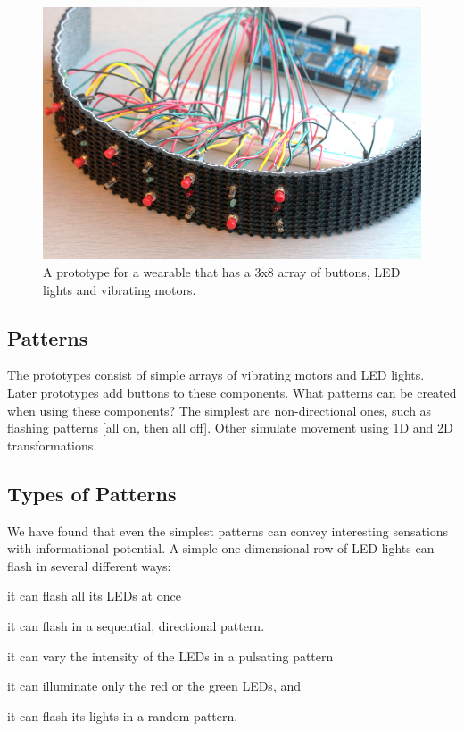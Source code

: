 \documentclass{chi-ext}
\begin{document}
\begin{figure}
  \begin{center}
  \includegraphics[width=\columnwidth]{images/P1130396.jpg}
  \caption{A prototype for a wearable that has a 3x8 array of buttons, LED lights and vibrating motors.}
  \label{fig:marginparsample}
  \end{center}  
\end{figure}

\subsection{Patterns}
The prototypes consist of simple arrays of vibrating motors and LED lights. Later prototypes add buttons to these components. What patterns can be created when using these components? The simplest are non-directional ones, such as flashing patterns [all on, then all off]. Other simulate movement using 1D and 2D transformations.

\subsection{Types of Patterns}
We have found that even the simplest patterns can convey interesting sensations with informational potential. A simple one-dimensional row of LED lights can flash in several different ways: \begin{inparaenum}
\item it can flash all its LEDs at once
\item it can flash in a sequential, directional pattern. 
\item it can vary the intensity of the LEDs in a pulsating pattern
\item it can illuminate only the red or the green LEDs, and
\item it can flash its lights in a random pattern. 
\end{inparaenum}
\end{document}
